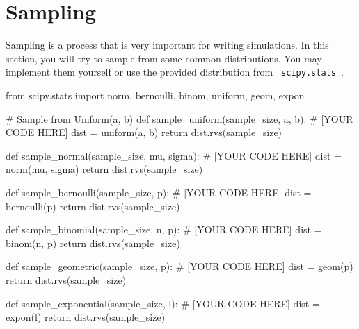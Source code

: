 \documentclass[a4paper, 10pt]{article}
\begin{document}
\subject[2110203 - Computer Engineering Mathematics II]


\section{Sampling}


Sampling is a process that is very important for writing simulations.
In this section, you will try to sample from some common distributions.
You may implement them yourself or use the provided distribution from \texttt{ scipy.stats }.

\begin{codingbox}
from scipy.stats import norm, bernoulli, binom, uniform, geom, expon

# Sample from Uniform(a, b)
def sample_uniform(sample_size, a, b):
  # [YOUR CODE HERE]
  dist = uniform(a, b)
  return dist.rvs(sample_size)

def sample_normal(sample_size, mu, sigma):
  # [YOUR CODE HERE]
  dist = norm(mu, sigma)
  return dist.rvs(sample_size)

def sample_bernoulli(sample_size, p):
  # [YOUR CODE HERE]
  dist = bernoulli(p)
  return dist.rvs(sample_size)

def sample_binomial(sample_size, n, p):
  # [YOUR CODE HERE]
  dist = binom(n, p)
  return dist.rvs(sample_size)

def sample_geometric(sample_size, p):
  # [YOUR CODE HERE]
  dist = geom(p)
  return dist.rvs(sample_size)

def sample_exponential(sample_size, l):
  # [YOUR CODE HERE]
  dist = expon(l)
  return dist.rvs(sample_size)
\end{codingbox}

\newpage
\end{document}
